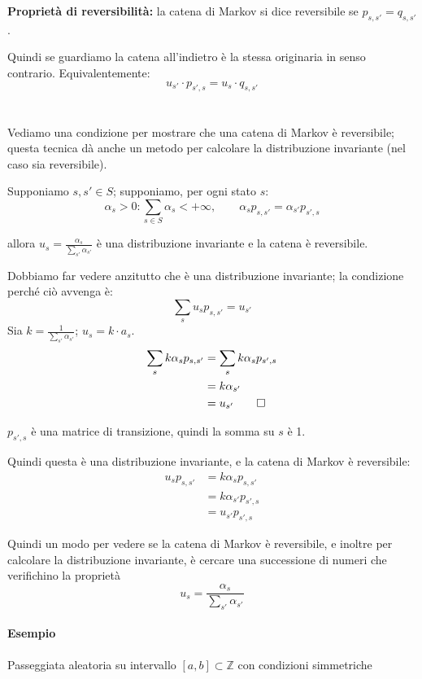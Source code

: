 \documentclass[a4paper,12pt]{book}
\begin{document}
\textbf{Proprietà di reversibilità:} 
 la catena di Markov si dice reversibile se $ p_{s,s'} = q_{s,s'} $. 

Quindi se guardiamo la catena all'indietro è la stessa originaria in senso contrario. Equivalentemente:
$$ u_{s'} \cdot p_{s',s} = u_s \cdot q_{s,s'} $$
\\
\\
Vediamo una condizione per mostrare che una catena di Markov è reversibile; questa tecnica dà anche un metodo per calcolare la distribuzione invariante (nel caso sia reversibile). 

Supponiamo $ s,s' \in S $; supponiamo, per ogni stato $ s $:
$$ \alpha_s > 0 : \sum_{s \in S} \alpha_s < + \infty, \qquad \alpha_s p_{s,s'} = \alpha_{s'}p_{s',s} $$ 

allora $ u_s = \frac{\alpha_{s}}{\sum_{s'} \alpha_{s'}} $ è una distribuzione invariante e la catena è reversibile. 

Dobbiamo far vedere anzitutto che è una distribuzione invariante; la condizione perché ciò avvenga è:
$$ \sum_{s} u_s p_{s,s'} = u_{s'} $$
Sia $ k = \frac{1}{\sum_{s'}\alpha_{s'}} $; $ u_s = k \cdot a_s $.
\begin{align*}
	\sum_{s} k\alpha_{s} p_{s,s'} & = \sum_{s} k \alpha_{s} p_{s',s} \\
	& = k \alpha_{s'} \\ 
	& = u_{s'} \qed
\end{align*}

$ p_{s',s} $ è una matrice di transizione, quindi la somma su $ s $ è 1. 

Quindi questa è una distribuzione invariante, e la catena di Markov è reversibile: 
\begin{align*}
u_s p_{s,s'} & = k \alpha_{s} p_{s,s'} \\
	& = k\alpha_{s'} p_{s',s} \\
	& = u_{s'} p_{s',s} 
\end{align*}

Quindi un modo per vedere se la catena di Markov è reversibile, e inoltre per calcolare la distribuzione invariante, è cercare una successione di numeri che verifichino la proprietà 
$$ u_s = \frac{\alpha_{s}}{\sum_{s'} \alpha_{s'}} $$

\paragraph{Esempio} Passeggiata aleatoria su intervallo $ [a, b] \subset \mathbb{Z} $ con condizioni simmetriche
\end{document}
